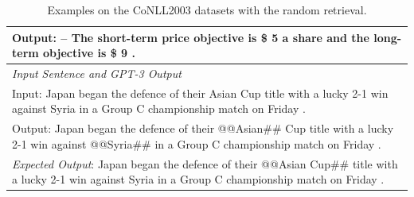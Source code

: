 \documentclass{article}
\begin{document}
\begin{table}[th!]
{\begin{tabular}{l}
Output: -- The short-term price objective is \$ 5 a share and the long-term objective is \$ 9 . \\\midrule
\textit{Input Sentence and GPT-3 Output} \\
Input: Japan began the defence of their Asian Cup title with a lucky 2-1 win against Syria in a Group C championship match on Friday . \\
Output: Japan began the defence of their @@Asian\#\# Cup title with a lucky 2-1 win against @@Syria\#\# in a Group C championship match on Friday . \\
{\color{blue}\it Expected Output}: Japan began the defence of their @@Asian Cup\#\# title with a lucky 2-1 win against Syria in a Group C championship match on Friday . \\\bottomrule
    \end{tabular}
    }
     \caption{Examples on the CoNLL2003 datasets with the random retrieval.}
    \label{tab:example_random_retrieval_embedding}
\end{table}
\end{document}
